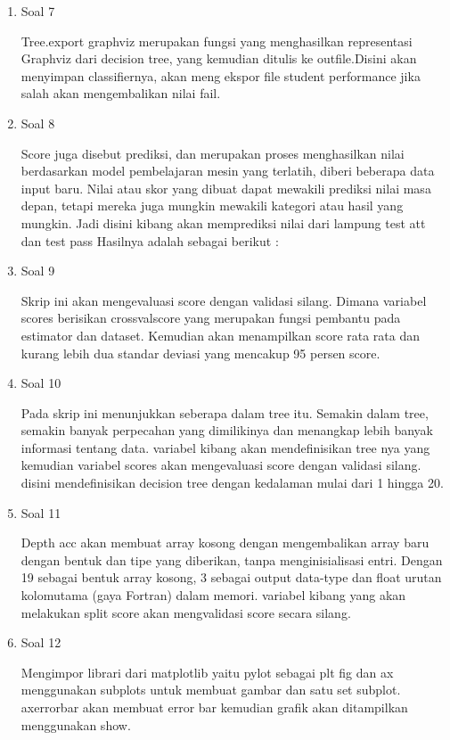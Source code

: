 \begin{enumerate}
	\item Soal 7
	\hfill\break
	
	Tree.export graphviz merupakan fungsi yang menghasilkan representasi Graphviz dari decision tree, yang kemudian ditulis ke outfile.Disini akan menyimpan classifiernya, akan meng ekspor file student performance jika salah akan mengembalikan nilai fail. 

	\item Soal 8
	\hfill\break
	
	Score juga disebut prediksi, dan merupakan proses menghasilkan nilai berdasarkan model pembelajaran mesin yang terlatih, diberi beberapa data input baru. Nilai atau skor yang dibuat dapat mewakili prediksi nilai masa depan, tetapi mereka juga mungkin mewakili kategori atau hasil yang mungkin. Jadi disini kibang akan memprediksi nilai dari lampung test att dan test pass Hasilnya adalah sebagai berikut :

	\item Soal 9
	\hfill\break
	
	Skrip ini akan mengevaluasi score dengan validasi silang. Dimana variabel scores berisikan crossvalscore yang merupakan fungsi pembantu pada estimator dan dataset. Kemudian akan menampilkan score rata rata dan kurang lebih dua standar deviasi yang mencakup 95 persen score. 

	\item Soal 10
	\hfill\break
	
	Pada skrip ini menunjukkan seberapa dalam tree itu. Semakin dalam tree, semakin banyak perpecahan yang dimilikinya dan menangkap lebih banyak informasi tentang data. variabel kibang akan mendefinisikan tree nya yang kemudian variabel scores akan mengevaluasi score dengan validasi silang. disini mendefinisikan decision tree dengan kedalaman mulai dari 1 hingga 20. 

	\item Soal 11
	\hfill\break
	
	Depth acc akan membuat array kosong dengan mengembalikan array baru dengan bentuk dan tipe yang diberikan, tanpa menginisialisasi entri. Dengan 19 sebagai bentuk array kosong, 3 sebagai output data-type dan float urutan kolomutama (gaya Fortran) dalam memori. variabel kibang yang akan melakukan split score akan mengvalidasi score secara silang.

	\item Soal 12
	\hfill\break
	
	Mengimpor librari dari matplotlib yaitu pylot sebagai plt fig dan ax menggunakan subplots untuk membuat gambar dan satu set subplot. axerrorbar akan membuat error bar kemudian grafik akan ditampilkan menggunakan show. 
\end{enumerate}


